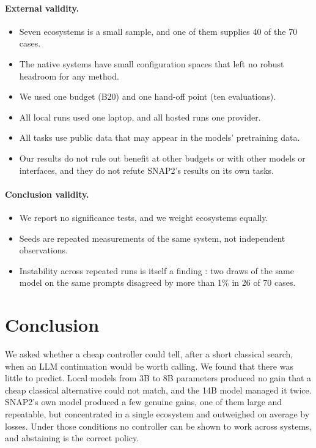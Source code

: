 \paragraph{External validity.}
\begin{itemize}
  \item Seven ecosystems is a small sample, and one of them supplies 40 of the 70 cases.
  \item The native systems have small configuration spaces that left no robust headroom for any method.
  \item We used one budget (B20) and one hand-off point (ten evaluations).
  \item All local runs used one laptop, and all hosted runs one provider.
  \item All tasks use public data that may appear in the models' pretraining data.
  \item Our results do not rule out benefit at other budgets or with other models or interfaces, and they do not refute SNAP2's results on its own tasks.
\end{itemize}

\paragraph{Conclusion validity.}
\begin{itemize}
  \item We report no significance tests, and we weight ecosystems equally.
  \item Seeds are repeated measurements of the same system, not independent observations.
  \item Instability across repeated runs is itself a finding \cite{rayegan2026instability}: two draws of the same model on the same prompts disagreed by more than 1\% in 26 of 70 cases.
\end{itemize}

\section{Conclusion}

We asked whether a cheap controller could tell, after a short classical search, when an LLM continuation would be worth calling. We found that there was little to predict. Local models from 3B to 8B parameters produced no gain that a cheap classical alternative could not match, and the 14B model managed it twice. SNAP2's own model produced a few genuine gains, one of them large and repeatable, but concentrated in a single ecosystem and outweighed on average by losses. Under those conditions no controller can be shown to work across systems, and abstaining is the correct policy.


